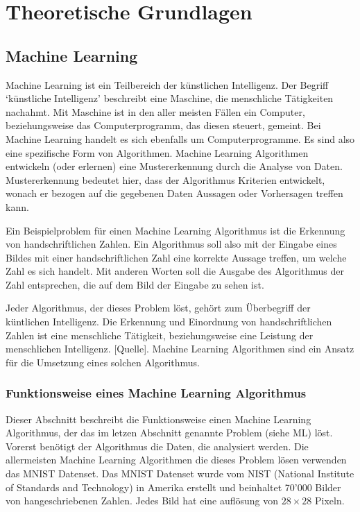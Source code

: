 \chapter{Theoretische Grundlagen}
\section{Machine Learning}
\label{chap:t_ml}
Machine Learning ist ein Teilbereich der künstlichen Intelligenz. Der Begriff
`künstliche Intelligenz' beschreibt eine Maschine, die menschliche Tätigkeiten
nachahmt. Mit Maschine ist in den aller meisten Fällen ein Computer,
beziehungsweise das Computerprogramm, das diesen steuert, gemeint. Bei Machine
Learning handelt es sich ebenfalls um Computerprogramme. Es sind also eine
spezifische Form von Algorithmen. Machine Learning Algorithmen entwickeln (oder
erlernen) eine Mustererkennung durch die Analyse von Daten. Mustererkennung
bedeutet hier, dass der Algorithmus Kriterien entwickelt, wonach er bezogen auf
die gegebenen Daten Aussagen oder Vorhersagen treffen kann.

Ein Beispielproblem für einen Machine Learning Algorithmus ist die Erkennung von
handschriftlichen Zahlen. Ein Algorithmus soll also mit der Eingabe eines Bildes
mit einer handschriftlichen Zahl eine korrekte Aussage treffen, um welche Zahl
es sich handelt. Mit anderen Worten soll die Ausgabe des Algorithmus der Zahl
entsprechen, die auf dem Bild der Eingabe zu sehen ist.

Jeder Algorithmus, der dieses Problem löst, gehört zum Überbegriff der
küntlichen Intelligenz. Die Erkennung und Einordnung von handschriftlichen
Zahlen ist eine menschliche Tätigkeit, beziehungsweise eine Leistung der
menschlichen Intelligenz. [Quelle]. Machine Learning Algorithmen sind ein Ansatz
für die Umsetzung eines solchen Algorithmus.

\subsection*{Funktionsweise eines Machine Learning Algorithmus}
Dieser Abschnitt beschreibt die Funktionsweise einen Machine Learning
Algorithmus, der das im letzen Abschnitt genannte Problem (siehe ML) löst.
Vorerst benötigt der Algorithmus die Daten, die analysiert werden. Die
allermeisten Machine Learning Algorithmen die dieses Problem lösen verwenden das
MNIST Datenset. Das MNIST Datenset wurde vom NIST (National Institute of
Standards and Technology) in Amerika erstellt und beinhaltet 70'000 Bilder von
hangeschriebenen Zahlen. Jedes Bild hat eine auflösung von $28\times28$ Pixeln.

